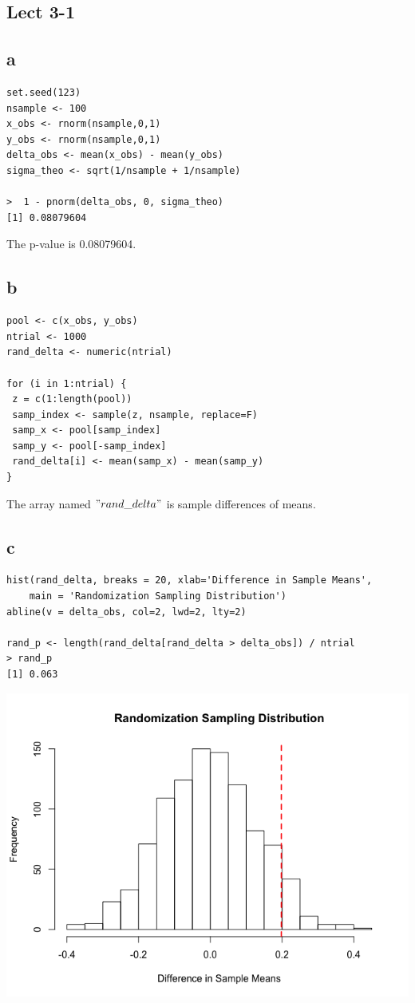 \documentclass[11pt,letterpaper]{article}
\begin{document}
\subsection*{Lect 3-1}
\subsection*{a}
\begin{verbatim}
set.seed(123)
nsample <- 100
x_obs <- rnorm(nsample,0,1)
y_obs <- rnorm(nsample,0,1)
delta_obs <- mean(x_obs) - mean(y_obs)
sigma_theo <- sqrt(1/nsample + 1/nsample)

>  1 - pnorm(delta_obs, 0, sigma_theo)
[1] 0.08079604
\end{verbatim}

The p-value is 0.08079604.

\subsection*{b}
\begin{verbatim}
pool <- c(x_obs, y_obs)
ntrial <- 1000
rand_delta <- numeric(ntrial)

for (i in 1:ntrial) {
 z = c(1:length(pool))
 samp_index <- sample(z, nsample, replace=F)
 samp_x <- pool[samp_index]
 samp_y <- pool[-samp_index]
 rand_delta[i] <- mean(samp_x) - mean(samp_y)
}
\end{verbatim}

The array named $" rand\_delta "$ is sample differences of means.

\subsection*{c}
\begin{verbatim}
hist(rand_delta, breaks = 20, xlab='Difference in Sample Means', 
    main = 'Randomization Sampling Distribution')
abline(v = delta_obs, col=2, lwd=2, lty=2)

rand_p <- length(rand_delta[rand_delta > delta_obs]) / ntrial
> rand_p
[1] 0.063
\end{verbatim}

\includegraphics[scale=0.5]{lec-3-1-c.png}
\end{document}
